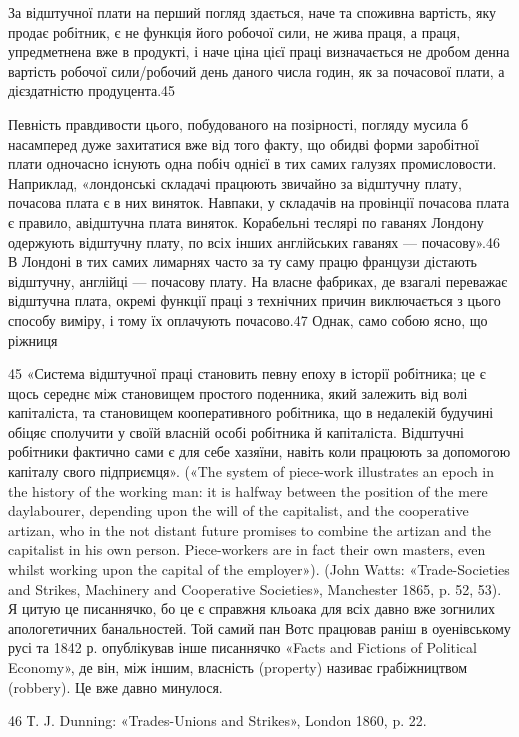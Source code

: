 За відштучної плати на перший погляд здається, наче та
споживна вартість, яку продає робітник, є не функція його
робочої сили, не жива праця, а праця, упредметнена вже в
продукті, і наче ціна цієї праці визначається не дробом
денна вартість робочої сили/робочий день даного числа годин,
як за почасової плати, а дієздатністю продуцента.45

Певність правдивости цього, побудованого на позірності, погляду
мусила б насамперед дуже захитатися вже від того факту,
що обидві форми заробітної плати одночасно існують одна побіч
однієї в тих самих галузях промисловости. Наприклад, «лондонські
складачі працюють звичайно за відштучну плату, почасова
плата є в них виняток. Навпаки, у складачів на провінції
почасова плата є правило, авідштучна плата виняток. Корабельні
теслярі по гаванях Лондону одержують відштучну плату, по
всіх інших англійських гаванях — почасову».46 В Лондоні в
тих самих лимарнях часто за ту саму працю французи дістають
відштучну, англійці — почасову плату. На власне фабриках,
де взагалі переважає відштучна плата, окремі функції праці з
технічних причин виключається з цього способу виміру, і тому
їх оплачують почасово.47 Однак, само собою ясно, що ріжниця

45 «Система відштучної праці становить певну епоху в історії робітника;
це є щось середнє між становищем простого поденника, який залежить
від волі капіталіста, та становищем кооперативного робітника, що
в недалекій будучині обіцяє сполучити у своїй власній особі робітника
й капіталіста. Відштучні робітники фактично сами є для себе хазяїни,
навіть коли працюють за допомогою капіталу свого підприємця». («The
system of piece-work illustrates an epoch in the history of the working
man: it is halfway between the position of the mere daylabourer, depending
upon the will of the capitalist, and the cooperative artizan, who in
the not distant future promises to combine the artizan and the capitalist
in his own person. Piece-workers are in fact their own masters, even whilst
working upon the capital of the employer»). (John Watts: «Trade-Societies
and Strikes, Machinery and Cooperative Societies», Manchester 1865,
p. 52, 53). Я цитую це писаннячко, бо це є справжня кльоака для всіх
давно вже зогнилих апологетичних банальностей. Той самий пан Вотс
працював раніш в оуенівському русі та 1842 р. опублікував інше писаннячко
«Facts and Fictions of Political Economy», де він, між іншим, власність
(property) називає грабіжництвом (robbery). Це вже давно минулося.

46    Т. J. Dunning: «Trades-Unions and Strikes», London 1860,
p. 22.

